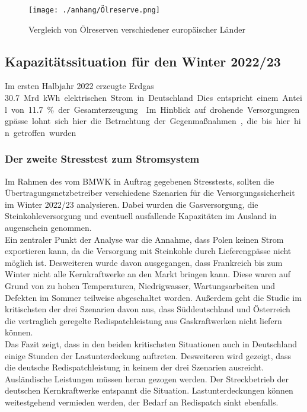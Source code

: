 	\begin{figure}[H]
		\centering
		\texttt{[image: ./anhang/Ölreserve.png]}
		\caption{Vergleich von Ölreserven verschiedener europäischer Länder}
		\label{Abb. Strategische Ölreserve} \cite{IEA_Ölreserven}
	\end{figure}
		
		
	\subsection{Kapazitätssituation für den Winter 2022/23}
	Im ersten Halbjahr 2022 erzeugte Erdgas \SI{30,7} Mrd. {kWh} elektrischen Strom in Deutschland. Dies entspricht einem Anteil von \SI{11,7}{\percent} der Gesamterzeugung.\cite{Stromproduktion_Erdgas} Im Hinblick auf drohende Versorgungsengpässe lohnt sich hier die Betrachtung der Gegenmaßnahmen, die bis hier hin getroffen wurden. \\
	
		\subsubsection{Der zweite Stresstest zum Stromsystem}
		Im Rahmen des vom BMWK in Auftrag gegebenen Stresstests, sollten die Übertragungsnetzbetreiber verschiedene Szenarien für die Versorgungssicherheit im Winter 2022/23 analysieren. Dabei wurden die Gasversorgung, die Steinkohleversorgung und eventuell ausfallende Kapazitäten im Ausland in augenschein genommen.\\
		
		Ein zentraler Punkt der Analyse war die Annahme, dass Polen keinen Strom exportieren kann, da die Versorgung mit Steinkohle durch Lieferengpässe nicht möglich ist. Desweiteren wurde davon ausgegangen, dass Frankreich bis zum Winter nicht alle Kernkraftwerke an den Markt bringen kann. Diese waren auf Grund von zu hohen Temperaturen, Niedrigwasser, Wartungsarbeiten und Defekten im Sommer teilweise abgeschaltet worden.\cite{AKW_Frankreich} Außerdem geht die Studie im kritischsten der drei Szenarien davon aus, dass Süddeutschland und Österreich die vertraglich geregelte Redispatchleistung aus Gaskraftwerken nicht liefern können. \\
		
		Das Fazit zeigt, dass in den beiden kritischsten Situationen auch in Deutschland einige Stunden der Lastunterdeckung auftreten. Desweiteren wird gezeigt, dass die deutsche Redispatchleistung in keinem der drei Szenarien ausreicht. Ausländische Leistungen müssen heran gezogen werden. Der Streckbetrieb der deutschen Kernkraftwerke entspannt die Situation. Lastunterdeckungen können weitestgehend vermieden werden, der Bedarf an Redispatch sinkt ebenfalls.\cite{Stresstest} \\
		
